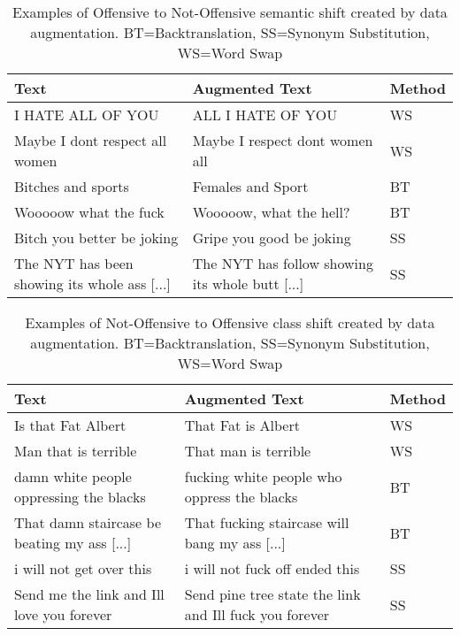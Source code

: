 \documentclass[11pt,a4paper]{article}
\begin{document}
\begin{table*}[]
\centering
\begin{tabular}{lll}
\hline
Text                         & Augmented Text                      & Method \\ \hline
I HATE ALL OF YOU & ALL I HATE OF YOU & WS \\
Maybe I dont respect all women                   & Maybe I respect dont women all                      & WS                         \\
Bitches and sports                               & Females and Sport                                   & BT                         \\
Wooooow what the fuck                            & Wooooow, what the hell?                             & BT                         \\
Bitch you better be joking                       & Gripe you good be joking                            & SS                         \\
The NYT has been showing its whole ass {[}...{]} & The NYT has follow showing its whole butt {[}...{]} & SS                         \\ \hline
\end{tabular}

\caption{\centering Examples of Offensive to Not-Offensive semantic shift created by data augmentation. \newline BT=Backtranslation, SS=Synonym Substitution, WS=Word Swap}
\label{tab:positive-shift}
\end{table*}

\begin{table*}[]
\centering
\begin{tabular}{lll}
\hline
Text                        & Augmented Text                         & Method \\ \hline
Is that Fat Albert & That Fat is Albert & WS \\
Man that is terrible & That man is terrible & WS \\
damn white people oppressing the blacks   & fucking white people who oppress the blacks      & BT                         \\
That damn staircase be beating my ass {[}...{]} & That fucking staircase will bang my ass {[}...{]}      & BT                         \\
i will not get over this                        & i will not fuck off ended this                         & SS                         \\
Send me the link and Ill love you forever      & Send pine tree state the link and Ill fuck you forever & SS                         \\ \hline
\end{tabular}
\caption{\centering Examples of Not-Offensive to Offensive class shift created by data augmentation. \newline BT=Backtranslation, SS=Synonym Substitution, WS=Word Swap}
\label{tab:negative-shift}
\end{table*}
\end{document}
